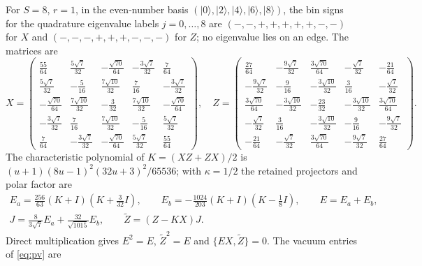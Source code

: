 \documentclass[11pt,a4paper]{article}
\newcommand{\ket}[1]{|#1\rangle}
\newcommand{\Zt}{\widetilde Z}
\begin{document}
For $S=8$, $r=1$, in the even-number basis $(\ket0,\ket2,\ket4,\ket6,\ket8)$, the bin signs for the quadrature eigenvalue labels $j=0,\dots,8$ are $(-,-,+,+,+,+,+,-,-)$ for $X$ and $(-,-,-,+,+,+,-,-,-)$ for $Z$; no eigenvalue lies on an edge. The matrices are
\begingroup\small
\begin{equation}
X=\begin{pmatrix}
\frac{55}{64}&\frac{5\sqrt7}{32}&-\frac{\sqrt{70}}{64}&-\frac{3\sqrt7}{32}&\frac7{64}\\[2pt]
\frac{5\sqrt7}{32}&-\frac5{16}&\frac{7\sqrt{10}}{32}&\frac7{16}&-\frac{3\sqrt7}{32}\\[2pt]
-\frac{\sqrt{70}}{64}&\frac{7\sqrt{10}}{32}&-\frac3{32}&\frac{7\sqrt{10}}{32}&-\frac{\sqrt{70}}{64}\\[2pt]
-\frac{3\sqrt7}{32}&\frac7{16}&\frac{7\sqrt{10}}{32}&-\frac5{16}&\frac{5\sqrt7}{32}\\[2pt]
\frac7{64}&-\frac{3\sqrt7}{32}&-\frac{\sqrt{70}}{64}&\frac{5\sqrt7}{32}&\frac{55}{64}
\end{pmatrix},\quad
Z=\begin{pmatrix}
\frac{27}{64}&-\frac{9\sqrt7}{32}&\frac{3\sqrt{70}}{64}&-\frac{\sqrt7}{32}&-\frac{21}{64}\\[2pt]
-\frac{9\sqrt7}{32}&-\frac9{16}&-\frac{3\sqrt{10}}{32}&\frac3{16}&-\frac{\sqrt7}{32}\\[2pt]
\frac{3\sqrt{70}}{64}&-\frac{3\sqrt{10}}{32}&-\frac{23}{32}&-\frac{3\sqrt{10}}{32}&\frac{3\sqrt{70}}{64}\\[2pt]
-\frac{\sqrt7}{32}&\frac3{16}&-\frac{3\sqrt{10}}{32}&-\frac9{16}&-\frac{9\sqrt7}{32}\\[2pt]
-\frac{21}{64}&-\frac{\sqrt7}{32}&\frac{3\sqrt{70}}{64}&-\frac{9\sqrt7}{32}&\frac{27}{64}
\end{pmatrix}.
\end{equation}
\endgroup
The characteristic polynomial of $K=(XZ+ZX)/2$ is $(u+1)(8u-1)^2(32u+3)^2/65536$; with $\kappa=1/2$ the retained projectors and polar factor are
\begin{equation}
\begin{gathered}
E_a=\tfrac{256}{63}(K+I)(K+\tfrac{3}{32}I),\qquad E_b=-\tfrac{1024}{203}(K+I)(K-\tfrac18I),\qquad E=E_a+E_b,\\
J=\tfrac{8}{3\sqrt7}E_a+\tfrac{32}{\sqrt{1015}}E_b,\qquad \Zt=(Z-KX)J .
\end{gathered}
\end{equation}
Direct multiplication gives $E^2=E$, $\Zt^2=E$ and $\{EX,\Zt\}=0$. The vacuum entries of \eqref{eq:pv} are
\end{document}
